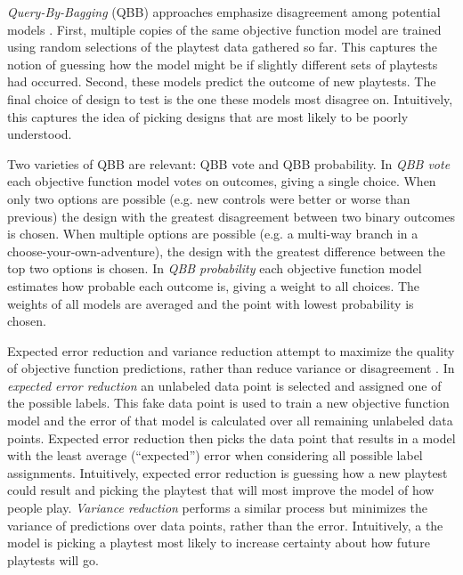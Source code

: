 \documentclass{sig-alternate}
\begin{document}
\textit{Query-By-Bagging} (QBB) approaches emphasize disagreement among potential models \cite{settles2012:al-book}.
First, multiple copies of the same objective function model are trained using random selections of the playtest data gathered so far.
This captures the notion of guessing how the model might be if slightly different sets of playtests had occurred.
Second, these models predict the outcome of new playtests.
The final choice of design to test is the one these models most disagree on.
Intuitively, this captures the idea of picking designs that are most likely to be poorly understood.

Two varieties of QBB are relevant: QBB vote and QBB probability.
In \textit{QBB vote} each objective function model votes on outcomes, giving a single choice.
When only two options are possible (e.g. new controls were better or worse than previous) the design with the greatest disagreement between two binary outcomes is chosen.
When multiple options are possible (e.g. a multi-way branch in a choose-your-own-adventure), the design with the greatest difference between the top two options is chosen.
%
In \textit{QBB probability} each objective function model estimates how probable each outcome is, giving a weight to all choices.
The weights of all models are averaged and the point with lowest probability is chosen. 

Expected error reduction and variance reduction attempt to maximize the quality of objective function predictions, rather than reduce variance or disagreement \cite{settles2012:al-book}.
In \textit{expected error reduction} an unlabeled data point is selected and assigned one of the possible labels.
This fake data point is used to train a new objective function model and the error of that model is calculated over all remaining unlabeled data points.
Expected error reduction then picks the data point that results in a model with the least average (``expected'') error when considering all possible label assignments.
Intuitively, expected error reduction is guessing how a new playtest could result and picking the playtest that will most improve the model of how people play.
\textit{Variance reduction} performs a similar process but minimizes the variance of predictions over data points, rather than the error.
Intuitively, a the model is picking a playtest most likely to increase certainty about how future playtests will go.
\end{document}
